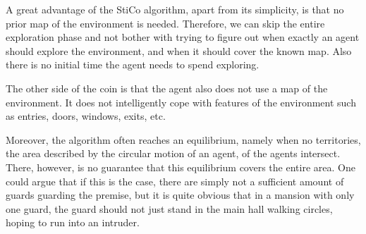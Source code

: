 A great advantage of the StiCo algorithm, apart from its simplicity, is that no prior map of the environment is needed. Therefore, we can skip the entire exploration phase and not bother with trying to figure out when exactly an agent should explore the environment, and when it should cover the known map. Also there is no initial time the agent needs to spend exploring.

The other side of the coin is that the agent also does not use a map of the environment. It does not intelligently cope with features of the environment such as entries, doors, windows, exits, etc.

Moreover, the algorithm often reaches an equilibrium, namely when no territories, the area described by the circular motion of an agent, of the agents intersect. There, however, is no guarantee that this equilibrium covers the entire area. One could argue that if this is the case, there are simply not a sufficient amount of guards guarding the premise, but it is quite obvious that in a mansion with only one guard, the guard should not just stand in the main hall walking circles, hoping to run into an intruder.

